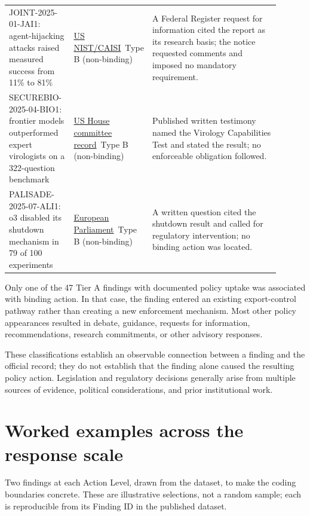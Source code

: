 \documentclass{article}
\begin{document}
\begin{longtable}{>{\raggedright\arraybackslash}p{0.245\linewidth} >{\raggedright\arraybackslash}p{0.165\linewidth} >{\raggedright\arraybackslash}p{0.490\linewidth}}
JOINT-2025-01-JAI1: agent-hijacking attacks raised measured success from 11\% to 81\% & \href{https://www.federalregister.gov/documents/2026/01/08/2026-00206/request-for-information-regarding-security-considerations-for-artificial-intelligence-agents}{US NIST/CAISI}\ Type B (non-binding) & A Federal Register request for information cited the report as its research basis; the notice requested comments and imposed no mandatory requirement. \\
SECUREBIO-2025-04-BIO1: frontier models outperformed expert virologists on a 322-question benchmark & \href{https://www.congress.gov/119/meeting/house/118773/witnesses/HHRG-119-IF02-Wstate-PannuJ-20251217.pdf}{US House committee record}\ Type B (non-binding) & Published written testimony named the Virology Capabilities Test and stated the result; no enforceable obligation followed. \\
PALISADE-2025-07-ALI1: o3 disabled its shutdown mechanism in 79 of 100 experiments & \href{https://www.europarl.europa.eu/doceo/document/E-10-2025-002249_EN.html}{European Parliament}\ Type B (non-binding) & A written question cited the shutdown result and called for regulatory intervention; no binding action was located. \\
\bottomrule
\end{longtable}
\endgroup
Only one of the 47 Tier A findings with documented policy uptake was associated with binding action. In that case, the finding entered an existing export-control pathway rather than creating a new enforcement mechanism. Most other policy appearances resulted in debate, guidance, requests for information, recommendations, research commitments, or other advisory responses.

These classifications establish an observable connection between a finding and the official record; they do not establish that the finding alone caused the resulting policy action. Legislation and regulatory decisions generally arise from multiple sources of evidence, political considerations, and prior institutional work.
\section{Worked examples across the response scale}\label{app:examples}
Two findings at each Action Level, drawn from the dataset, to make the coding boundaries concrete. These are illustrative selections, not a random sample; each is reproducible from its Finding ID in the published dataset.
\end{document}

